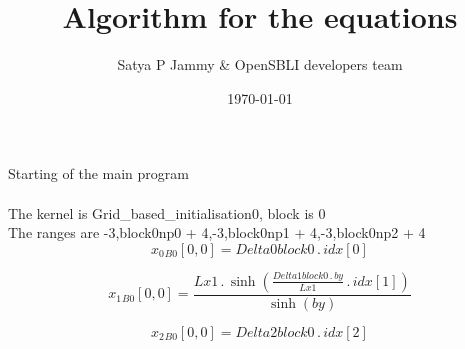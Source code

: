 \documentclass{article}
\title{Algorithm for the equations}
\author{Satya P Jammy \& OpenSBLI developers team}
\date{\today}
\begin{document}
\maketitle
\noindent Starting of the main program\\
\\\noindent The kernel is Grid_based_initialisation0, block is 0\\\noindent The ranges are -3,block0np0 + 4,-3,block0np1 + 4,-3,block0np2 + 4\\\begin{dmath}{x_{0}{_{B0}}}[{0,0}] = Delta0block0 \,.\, {idx}[{0}]\end{dmath}

\begin{dmath}{x_{1}{_{B0}}}[{0,0}] = \frac{Lx1 \,.\, \sinh{\left (\frac{Delta1block0 \,.\, by}{Lx1} \,.\, {idx}[{1}] \right )}}{\sinh{\left (by \right )}}\end{dmath}

\begin{dmath}{x_{2}{_{B0}}}[{0,0}] = Delta2block0 \,.\, {idx}[{2}]\end{dmath}
\end{document}

